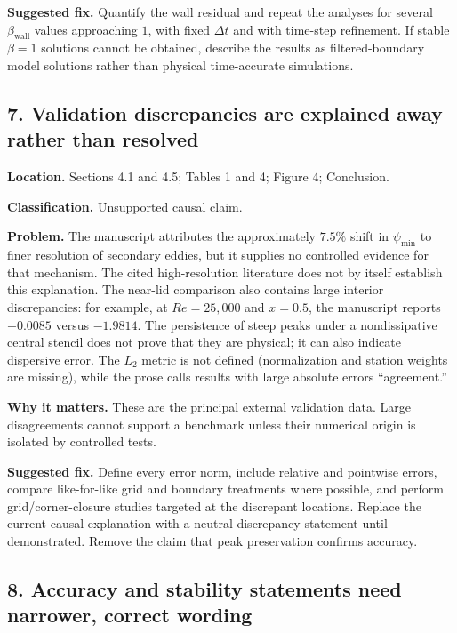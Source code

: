 \documentclass[11pt]{article}
\newcommand{\Rey}{\mathit{Re}}
\begin{document}
\textbf{Suggested fix.} Quantify the wall residual and repeat the analyses for several $\beta_{\mathrm{wall}}$ values approaching $1$, with fixed $\Delta t$ and with time-step refinement. If stable $\beta=1$ solutions cannot be obtained, describe the results as filtered-boundary model solutions rather than physical time-accurate simulations.

\subsection*{7. Validation discrepancies are explained away rather than resolved}

\textbf{Location.} Sections 4.1 and 4.5; Tables 1 and 4; Figure 4; Conclusion.

\textbf{Classification.} Unsupported causal claim.

\textbf{Problem.} The manuscript attributes the approximately $7.5\%$ shift in $\psi_{\min}$ to finer resolution of secondary eddies, but it supplies no controlled evidence for that mechanism. The cited high-resolution literature does not by itself establish this explanation. The near-lid comparison also contains large interior discrepancies: for example, at $\Rey=25{,}000$ and $x=0.5$, the manuscript reports $-0.0085$ versus $-1.9814$. The persistence of steep peaks under a nondissipative central stencil does not prove that they are physical; it can also indicate dispersive error. The $L_2$ metric is not defined (normalization and station weights are missing), while the prose calls results with large absolute errors ``agreement.''

\textbf{Why it matters.} These are the principal external validation data. Large disagreements cannot support a benchmark unless their numerical origin is isolated by controlled tests.

\textbf{Suggested fix.} Define every error norm, include relative and pointwise errors, compare like-for-like grid and boundary treatments where possible, and perform grid/corner-closure studies targeted at the discrepant locations. Replace the current causal explanation with a neutral discrepancy statement until demonstrated. Remove the claim that peak preservation confirms accuracy.

\subsection*{8. Accuracy and stability statements need narrower, correct wording}
\end{document}
